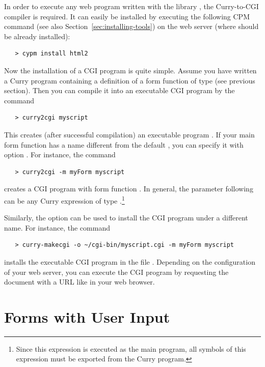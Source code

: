 In order to execute any web program written with the
library , the Curry-to-CGI compiler
 is required.
It can easily be installed by executing
the following CPM command (see also Section~\ref{sec:installing-tools})
on the web server (where \pakcs should be already installed):
%
\begin{verbatim}
   > cypm install html2
\end{verbatim}
%
Now the installation of a CGI program is quite simple.
Assume you have written a Curry program 
containing a definition of a form function 
of type  (see previous section).
Then you can compile it into an executable CGI program
by the command
%
\begin{verbatim}
   > curry2cgi myscript
\end{verbatim}
%
This creates (after successful compilation) an executable program
.
If your main form function has a name different from the default ,
you can specify it with option .
For instance, the command
%
\begin{verbatim}
   > curry2cgi -m myForm myscript
\end{verbatim}
%
creates a CGI program with form function .
In general, the parameter following  can be any Curry expression
of type .\footnote{%
Since this expression is executed as the main program,
all symbols of this expression must be exported from the
Curry program.}

Similarly, the option  can be used to install the CGI program
under a different name. For instance, the command
%
\begin{verbatim}
   > curry-makecgi -o ~/cgi-bin/myscript.cgi -m myForm myscript
\end{verbatim}
%
installs the executable CGI program
in the file .
Depending on the configuration of your web server,
you can execute the CGI program by requesting the
document with a URL like
in your web browser.


\section{Forms with User Input}
\label{sec-html-forms}

